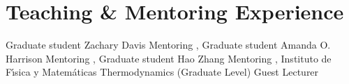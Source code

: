 \section{Teaching \& Mentoring Experience}

%
{Graduate student}%
{Zachary Davis \textnormal{\cite{Davis:2021ru,Davis:2024ru}}}%
{Mentoring}%
{\DPA, \Purdue}%
{}
%
%
{Graduate student}%
{Amanda O. Harrison \textnormal{\cite{RuedaBecerril:2021ha}}}%
{Mentoring}%
{\DPA, \Purdue}%
{}
%
%
{Graduate student}%
{Hao Zhang \textnormal{\cite{Zhang:2020ch}}}%
{Mentoring}%
{\DPA, \Purdue}%
{}
%
%
{Instituto de F\'{\i}sica y Matem\'{a}ticas}%
{Thermodynamics (Graduate Level)}%
{Guest Lecturer}%
{\UMSNHes}%
{}
